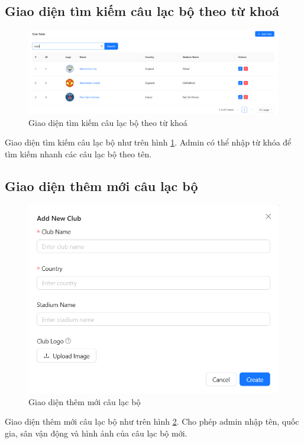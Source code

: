 \documentclass[../BTL.tex]{subfiles}
\begin{document}
\subsection{Giao diện tìm kiếm câu lạc bộ theo từ khoá}
\begin{figure}
    \centering
    \includegraphics[width=1\linewidth]{Hinhve/admin_search_club.png}
    \caption{Giao diện tìm kiếm câu lạc bộ theo từ khoá}
    \label{fig:admin_search_club}
\end{figure}
Giao diện tìm kiếm câu lạc bộ như trên hình \ref{fig:admin_search_club}. Admin có thể nhập từ khóa để tìm kiếm nhanh các câu lạc bộ theo tên.

\subsection{Giao diện thêm mới câu lạc bộ}
\begin{figure}
    \centering
    \includegraphics[width=1\linewidth]{Hinhve/admin_add_club.png}
    \caption{Giao diện thêm mới câu lạc bộ}
    \label{fig:admin_add_club}
\end{figure}
Giao diện thêm mới câu lạc bộ như trên hình \ref{fig:admin_add_club}. Cho phép admin nhập tên, quốc gia, sân vận động và hình ảnh của câu lạc bộ mới.
\end{document}
